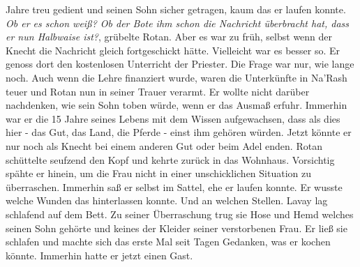 Jahre treu gedient und seinen Sohn sicher getragen, kaum das er laufen konnte.\\
\textit{Ob er es schon weiß? Ob der Bote ihm schon die Nachricht überbracht hat, dass er nun 
Halbwaise ist?}, grübelte Rotan. Aber es war zu früh, selbst wenn der Knecht die Nachricht gleich 
fortgeschickt hätte. Vielleicht war es besser so. Er genoss dort den kostenlosen Unterricht der 
Priester. Die Frage war nur, wie lange noch. Auch wenn die Lehre finanziert wurde, waren die 
Unterkünfte in Na'Rash teuer und Rotan nun in seiner Trauer verarmt. Er wollte nicht darüber 
nachdenken, wie sein Sohn toben würde, wenn er das Ausmaß erfuhr. Immerhin war er die 15 Jahre 
seines Lebens mit dem Wissen aufgewachsen, dass als dies hier - das Gut, das Land, die Pferde - 
einst ihm gehören würden. Jetzt könnte er nur noch als Knecht bei einem anderen Gut oder beim Adel 
enden. Rotan schüttelte seufzend den Kopf und kehrte zurück in das Wohnhaus. Vorsichtig spähte er 
hinein, um die Frau nicht in einer unschicklichen Situation zu überraschen. Immerhin saß er selbst 
im Sattel, ehe er laufen konnte. Er wusste welche Wunden das hinterlassen konnte. Und an welchen 
Stellen. Lavay lag schlafend auf dem Bett. Zu seiner Überraschung trug sie Hose und Hemd welches 
seinen Sohn gehörte und keines der Kleider seiner verstorbenen Frau. Er ließ sie schlafen und 
machte sich das erste Mal seit Tagen Gedanken, was er kochen könnte. Immerhin hatte er jetzt einen 
Gast.\\